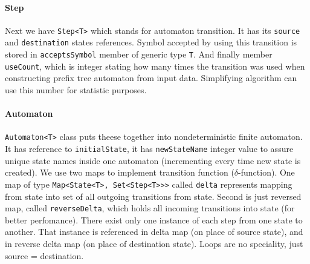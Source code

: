 \documentclass[a4paper,10pt,oneside]{article}
\newcommand{\code}[1]{\texttt{#1}}
\begin{document}
\paragraph{Step}
Next we have \code{Step<T>} which stands for automaton transition.
It has its \code{source} and \code{destination} states references.
Symbol accepted by using this transition is stored in \code{acceptsSymbol} member of generic type \code{T}.
And finally member \code{useCount}, which is integer stating how many times the transition was used when constructing prefix tree automaton from input data.
Simplifying algorithm can use this number for statistic purposes.

\paragraph{Automaton}
\code{Automaton<T>} class puts theese together into nondeterministic finite automaton.
It has reference to \code{initialState}, it has \code{newStateName} integer value to assure unique state names inside one automaton (incrementing every time new state is created).
We use two maps to implement transition function ($\delta$-function).
One map of type \code{Map<State<T>, Set<Step<T>{}>{}>} called \code{delta} represents mapping from state into set of all outgoing transitions from state.
Second is just reversed map, called \code{reverseDelta}, which holds all incoming transitions into state (for better perfomance).
There exist only one instance of each step from one state to another.
That instance is referenced in delta map (on place of source state), and in reverse delta map (on place of destination state).
Loops are no speciality, just source = destination.
\end{document}
